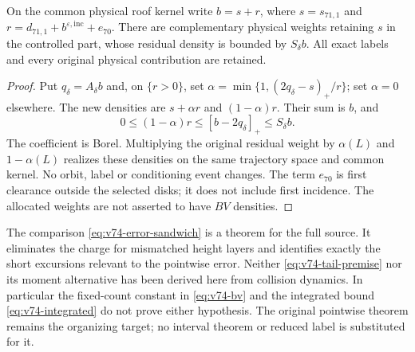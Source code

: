 \begin{proposition}
\label{prop:v74-preserved-capacity}
On the common physical roof kernel write
$b=s+r$, where $s=s_{71,1}$ and
$r=d_{71,1}+b^{\varepsilon,\mathrm{inc}}+e_{70}$.
There are complementary physical weights retaining $s$ in the
controlled part, whose residual density is bounded by $S_\delta b$.
All exact labels and every original physical contribution are retained.
\end{proposition}
\begin{proof}
Put $q_\delta=A_\delta b$ and, on $\{r>0\}$, set
$\alpha=\min\{1,(2q_\delta-s)_+/r\}$; set $\alpha=0$ elsewhere.
The new densities are $s+\alpha r$ and $(1-\alpha)r$.
Their sum is $b$, and
\[
 0\le(1-\alpha)r\le[b-2q_\delta]_+\le S_\delta b.
\]
The coefficient is Borel. Multiplying the original residual weight
by $\alpha(L)$ and $1-\alpha(L)$ realizes these densities on the
same trajectory space and common kernel. No orbit, label or
conditioning event changes. The term $e_{70}$ is first clearance
outside the selected disks; it does not include first incidence.
The allocated weights are not asserted to have $BV$ densities.
\end{proof}

The comparison \eqref{eq:v74-error-sandwich} is a theorem for the
full source. It eliminates the charge for mismatched height layers
and identifies exactly the short excursions relevant to the
pointwise error. Neither \eqref{eq:v74-tail-premise} nor its moment
alternative has been derived here from collision dynamics.
In particular the fixed-count constant in \eqref{eq:v74-bv} and
the integrated bound \eqref{eq:v74-integrated} do not prove either
hypothesis. The original pointwise theorem remains the organizing
target; no interval theorem or reduced label is substituted for it.
